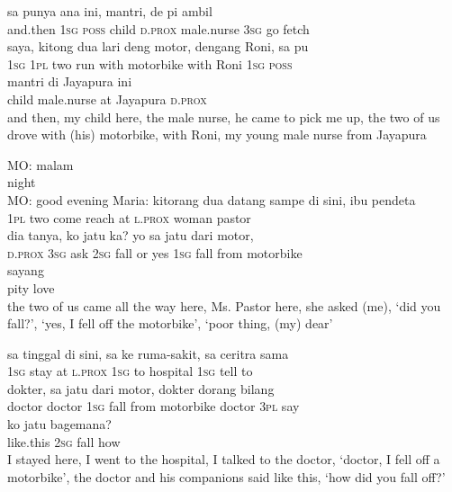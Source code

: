 \ea
{}    {sa}    {punya}    {ana}    {ini,}    {mantri,}    {de}    {pi}    {ambil}\\
   {and.then}    {\textsc{1sg}}    {\textsc{poss}}    {child}    {\textsc{d.prox}}    {male.nurse}    {\textsc{3sg}}    {go}    {fetch}\\
\gll saya,    {kitong}    {dua}    {lari}    {deng}    {motor,}    {dengang}    {Roni,}    {sa}   pu\\
  \textsc{1sg}    {\textsc{1pl}}    {two}    {run}    {with}    {motorbike}    {with}    {Roni}    {\textsc{1sg}}   \textsc{poss}\\
    {mantri}    {di}    {Jayapura}    {ini}\\
   {child}    {male.nurse}    {at}    {Jayapura}    {\textsc{d.prox}}\\
\glt
and then, my child here, the male nurse, he came to pick me up, the two of us drove with (his) motorbike, with Roni, my young male nurse from Jayapura
\z

\ea
\gll   MO:   malam\\
 {}    night\\
 MO: good evening
\z
\ea
\gll   Maria:    {kitorang}    {dua}    {datang}    {sampe}   di    {sini,}    {ibu}    {pendeta}\\
{}     {\textsc{1pl}}    {two}    {come}    {reach}   at    {\textsc{l.prox}}    {woman}    {pastor}\\
    {dia}    {tanya,}    {ko}    {jatu}   ka?    {yo}   sa    {jatu}    {dari}   motor,\\
   {\textsc{d.prox}}    {\textsc{3sg}}    {ask}    {\textsc{2sg}}    {fall}   or    {yes}   \textsc{1sg}    {fall}    {from}   motorbike\\
    {sayang}\\
   {pity}    {love}\\
\glt
the two of us came all the way here, Ms. Pastor here, she asked (me), ‘did you fall?’, ‘yes, I fell off the motorbike’, ‘poor thing, (my) dear’
\z

\ea
\gll   sa    {tinggal}    {di}    {sini,}    {sa}    {ke}    {ruma-sakit,}    {sa}    {ceritra}   sama\\
  \textsc{1sg}    {stay}    {at}    {\textsc{l.prox}}    {\textsc{1sg}}    {to}    {hospital}    {\textsc{1sg}}    {tell}   to\\
    {dokter,}    {sa}    {jatu}    {dari}    {motor,}    {dokter}    {dorang}    {bilang}\\
   {doctor}    {doctor}    {\textsc{1sg}}    {fall}    {from}    {motorbike}    {doctor}    {\textsc{3pl}}    {say}\\
    {ko}    {jatu}    {bagemana?}\\
   {like.this}    {\textsc{2sg}}    {fall}    {how}\\
\glt
I stayed here, I went to the hospital, I talked to the doctor, ‘doctor, I fell off a motorbike’, the doctor and his companions said like this, ‘how did you fall off?’
\z

